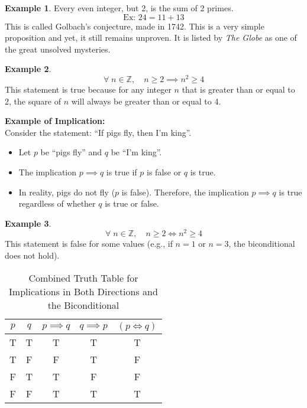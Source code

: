 \documentclass[11pt]{article}
\theoremstyle{definition}
\newtheorem{example}{Example}
\begin{document}
\begin{example}
Every even integer, but 2, is the sum of 2 primes.
\[
\text{Ex: } 24 = 11 + 13
\]
This is called Golbach's conjecture, made in 1742. This is a very simple proposition and yet, it still remains unproven. It is listed by \textit{The Globe} as one of the great unsolved mysteries.
\end{example}

\begin{example}
  \[
  \forall \; n \in \mathbb{Z},\quad n \geq 2 \implies n^2 \geq 4
  \]
  This statement is true because for any integer \( n \) that is greater than or equal to 2, the square of \( n \) will always be greater than or equal to 4.

  \textbf{Example of Implication:} \\
  Consider the statement: ``If pigs fly, then I'm king''.
  \begin{itemize}
    \item Let \(p\) be ``pigs fly'' and \(q\) be ``I'm king''.
    \item The implication \(p \implies q\) is true if \(p\) is false or \(q\) is true.
    \item In reality, pigs do not fly (\(p\) is false). Therefore, the implication \(p \implies q\) is true regardless of whether \(q\) is true or false.
  \end{itemize}
\end{example}

\begin{example}
\[
\forall \; n \in \mathbb{Z},\quad n \geq 2 \iff n^2 \geq 4
\]
This statement is false for some values (e.g., if \(n=1\) or \(n=3\), the biconditional does not hold).
\end{example}

\begin{table}[h!]
\centering
\begin{tabular}{ccccc}
\toprule
\(p\) & \(q\) & \(p \implies q\) & \(q \implies p\) & \((p \iff q)\) \\
\midrule
T & T & T & T & T \\
T & F & F & T & F \\
F & T & T & F & F \\
F & F & T & T & T \\
\bottomrule
\end{tabular}
\caption{Combined Truth Table for Implications in Both Directions and the Biconditional}
\end{table}
\end{document}
